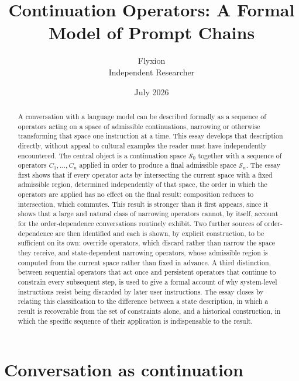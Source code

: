 \documentclass[11pt]{article}
\title{Continuation Operators: A Formal Model of Prompt Chains}
\author{Flyxion \\ \small Independent Researcher}
\date{July 2026}
\begin{document}
\maketitle

\begin{abstract}
A conversation with a language model can be described formally as a sequence of operators acting on a space of admissible continuations, narrowing or otherwise transforming that space one instruction at a time. This essay develops that description directly, without appeal to cultural examples the reader must have independently encountered. The central object is a continuation space $\mathcal{S}_0$ together with a sequence of operators $C_1, \ldots, C_n$ applied in order to produce a final admissible space $\mathcal{S}_n$. The essay first shows that if every operator acts by intersecting the current space with a fixed admissible region, determined independently of that space, the order in which the operators are applied has no effect on the final result: composition reduces to intersection, which commutes. This result is stronger than it first appears, since it shows that a large and natural class of narrowing operators cannot, by itself, account for the order-dependence conversations routinely exhibit. Two further sources of order-dependence are then identified and each is shown, by explicit construction, to be sufficient on its own: override operators, which discard rather than narrow the space they receive, and state-dependent narrowing operators, whose admissible region is computed from the current space rather than fixed in advance. A third distinction, between sequential operators that act once and persistent operators that continue to constrain every subsequent step, is used to give a formal account of why system-level instructions resist being discarded by later user instructions. The essay closes by relating this classification to the difference between a state description, in which a result is recoverable from the set of constraints alone, and a historical construction, in which the specific sequence of their application is indispensable to the result.
\end{abstract}

\newpage
\section{Conversation as continuation}
\end{document}
